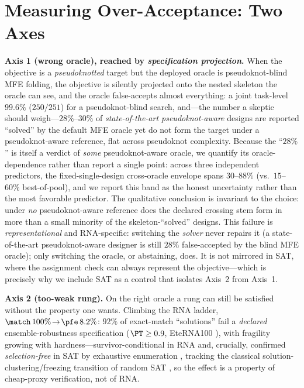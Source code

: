 \section{Measuring Over-Acceptance: Two Axes}
\textbf{Axis 1 (wrong oracle), reached by \emph{specification projection}.} When the objective is a
\emph{pseudoknotted} target but the deployed oracle is pseudoknot-blind MFE folding, the objective is
silently projected onto the nested skeleton the oracle can see, and the oracle false-accepts almost
everything: a joint task-level $99.6\%$ ($250/251$) for a pseudoknot-blind search, and---the number a
skeptic should weigh---$28\%$--$30\%$ of \emph{state-of-the-art pseudoknot-aware} designs are reported
``solved'' by the default MFE oracle yet do not form the target under a pseudoknot-aware reference, flat
across pseudoknot complexity. Because the ``$28\%$'' is itself a
verdict of \emph{some} pseudoknot-aware oracle, we quantify its oracle-dependence rather than report a single
point: across three independent predictors, the fixed-single-design cross-oracle envelope spans $30$--$88\%$
(vs.\ $15$--$60\%$ best-of-pool), and we report this band as the honest uncertainty rather than the most
favorable predictor. The qualitative conclusion is invariant to the choice: under \emph{no} pseudoknot-aware
reference does the declared crossing stem form in more than a small minority of the skeleton-``solved''
designs. This failure is \emph{representational} and RNA-specific: switching the \emph{solver} never repairs
it (a state-of-the-art pseudoknot-aware designer is still $28\%$ false-accepted by the blind MFE oracle);
only switching the oracle, or abstaining, does. It is not mirrored in SAT, where the assignment check can
always represent the objective---which is precisely why we include SAT as a control that isolates Axis~2 from
Axis~1.

\textbf{Axis 2 (too-weak rung).} On the right oracle a rung can still be satisfied without the property one
wants. Climbing the RNA ladder, $\match\,100\%\!\to\!\pfe\,8.2\%$: $92\%$ of exact-match ``solutions'' fail a
\emph{declared} ensemble-robustness specification ($\PT\ge0.9$, EteRNA100 \citep{eterna100v2}), with fragility
growing with hardness---survivor-conditional in RNA and, crucially, confirmed \emph{selection-free} in SAT by
exhaustive enumeration \citep{ardelius2008exhaustive}, tracking the classical solution-clustering/freezing
transition of random SAT \citep{krzakala2007clustering,zhou2008frozen}, so the effect is a property of
cheap-proxy verification, not of RNA.

